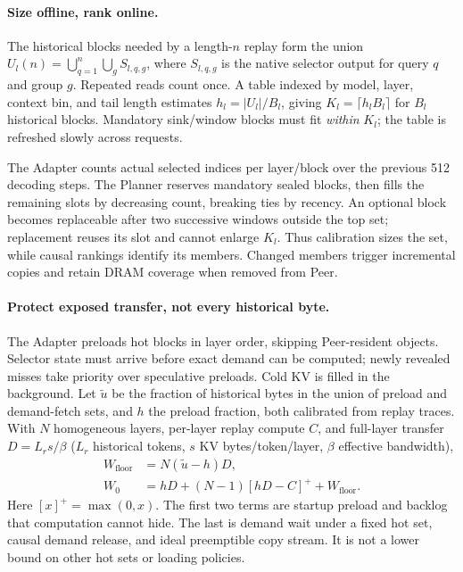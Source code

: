 \paragraph{Size offline, rank online.}
The historical blocks needed by a length-$n$ replay form the union
$U_l(n)=\bigcup_{q=1}^{n}\bigcup_g S_{l,q,g}$, where $S_{l,q,g}$ is the
native selector output for query $q$ and group $g$. Repeated reads count
once. A table indexed by model, layer, context bin, and tail length
estimates $h_l=|U_l|/B_l$, giving $K_l=\lceil h_l B_l\rceil$ for $B_l$
historical blocks. Mandatory sink/window blocks must fit \emph{within}
$K_l$; the table is refreshed slowly across requests.

The Adapter counts actual selected indices per layer/block over the
previous 512 decoding steps. The Planner reserves mandatory sealed
blocks, then fills the remaining slots by decreasing count, breaking
ties by recency. An optional block becomes replaceable after two
successive windows outside the top set; replacement reuses its slot
and cannot enlarge $K_l$. Thus calibration sizes the set, while causal
rankings identify its members. Changed members trigger incremental
copies and retain DRAM coverage when removed from Peer.

\paragraph{Protect exposed transfer, not every historical byte.}
The Adapter preloads hot blocks in layer order, skipping Peer-resident
objects. Selector state must arrive before exact demand can be computed;
newly revealed misses take priority over speculative preloads. Cold KV
is filled in the background. Let $\widetilde u$ be the fraction of
historical bytes in the union of preload and demand-fetch sets, and
$h$ the preload fraction, both calibrated from replay traces.
With $N$ homogeneous layers, per-layer replay
compute $C$, and full-layer transfer $D=L_rs/\beta$ ($L_r$ historical
tokens, $s$ KV bytes/token/layer, $\beta$ effective bandwidth),
\begin{align}
 W_{\mathrm{floor}}&=N(\widetilde u-h)D,\label{eq:demand-floor}\\
 W_0&=hD+(N-1)[hD-C]^++W_{\mathrm{floor}}.\label{eq:exposed-wait}
\end{align}
Here $[x]^+=\max(0,x)$. The first two terms are startup preload and
backlog that computation cannot hide. The last is demand wait under a
fixed hot set, causal demand release, and ideal preemptible copy stream.
It is not a lower bound on other hot sets or loading policies.

